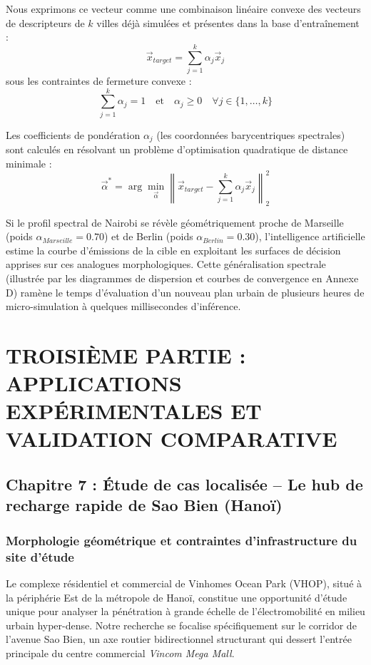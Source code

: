 \documentclass[10pt, a4paper]{article}
\begin{document}
Nous exprimons ce vecteur comme une combinaison linéaire convexe des
vecteurs de descripteurs de \(k\) villes déjà simulées et présentes dans
la base d'entraînement :
\[\vec{x}_{target} = \sum_{j=1}^k \alpha_j \vec{x}_j\] sous les
contraintes de fermeture convexe :
\[\sum_{j=1}^k \alpha_j = 1 \quad \text{et} \quad \alpha_j \ge 0 \quad \forall j \in \{1, \dots, k\}\]

Les coefficients de pondération \(\alpha_j\) (les coordonnées
barycentriques spectrales) sont calculés en résolvant un problème
d'optimisation quadratique de distance minimale :
\[\vec{\alpha}^* = \arg\min_{\vec{\alpha}} \left\| \vec{x}_{target} - \sum_{j=1}^k \alpha_j \vec{x}_j \right\|_2^2\]

Si le profil spectral de Nairobi se révèle géométriquement proche de
Marseille (poids \(\alpha_{Marseille} = 0.70\)) et de Berlin (poids
\(\alpha_{Berlin} = 0.30\)), l'intelligence artificielle estime la
courbe d'émissions de la cible en exploitant les surfaces de décision
apprises sur ces analogues morphologiques. Cette généralisation
spectrale (illustrée par les diagrammes de dispersion et courbes de
convergence en Annexe D) ramène le temps d'évaluation d'un nouveau plan
urbain de plusieurs heures de micro-simulation à quelques millisecondes
d'inférence.

\newpage

\section{TROISIÈME PARTIE : APPLICATIONS EXPÉRIMENTALES ET VALIDATION
COMPARATIVE}\label{troisiuxe8me-partie-applications-expuxe9rimentales-et-validation-comparative}

\subsection{Chapitre 7 : Étude de cas localisée -- Le hub de recharge
rapide de Sao Bien
(Hanoï)}\label{chapitre-7-uxe9tude-de-cas-localisuxe9e-le-hub-de-recharge-rapide-de-sao-bien-hanouxef}

\subsubsection{Morphologie géométrique et contraintes d'infrastructure
du site
d'étude}\label{morphologie-guxe9omuxe9trique-et-contraintes-dinfrastructure-du-site-duxe9tude}

Le complexe résidentiel et commercial de Vinhomes Ocean Park (VHOP),
situé à la périphérie Est de la métropole de Hanoï, constitue une
opportunité d'étude unique pour analyser la pénétration à grande échelle
de l'électromobilité en milieu urbain hyper-dense. Notre recherche se
focalise spécifiquement sur le corridor de l'avenue Sao Bien, un axe
routier bidirectionnel structurant qui dessert l'entrée principale du
centre commercial \emph{Vincom Mega Mall}.
\end{document}

